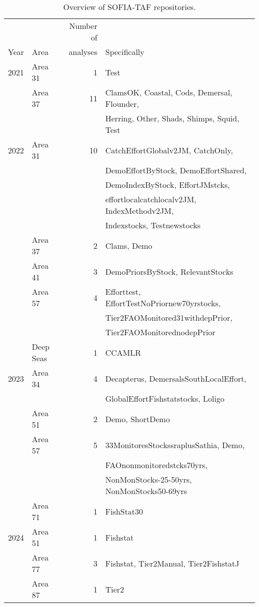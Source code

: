 \documentclass[12pt]{article}
\newcommand\I[1]{\rule{0pt}{#1}}
\begin{document}
\begin{table}[htb]\small
  \caption{Overview of SOFIA-TAF repositories.}
  \centering
  \begin{tabular}{llrl}
    \hline
    ~ & ~ & Number of\I{2.4ex}\\
    Year & Area & analyses & Specifically\\
    \hline
    2021 & Area 31   &  1 & Test\I{2.4ex}\\[0.2ex]
    ~    & Area 37   & 11 & ClamsOK, Coastal, Cods, Demersal, Flounder,\\
    ~    & ~         &  ~ & Herring, Other, Shads, Shimps, Squid, Test\\[0.5ex]
    2022 & Area 31   & 10 & CatchEffortGlobalv2JM, CatchOnly,\\
    ~    & ~         &  ~ & DemoEffortByStock, DemoEffortShared,\\
    ~    & ~         &  ~ & DemoIndexByStock, EffortJMstcks,\\
    ~    & ~         &  ~ & effortlocalcatchlocalv2JM, IndexMethodv2JM,\\
    ~    & ~         &  ~ & Indexstocks, Testnewstocks\\[0.2ex]
    ~    & Area 37   &  2 & Clams, Demo\\[0.2ex]
    ~    & Area 41   &  3 & DemoPriorsByStock, RelevantStocks\\[0.2ex]
    ~    & Area 57   &  4 & Efforttest, EffortTestNoPriornew70yrstocks,\\
    ~    & ~         &  ~ & Tier2FAOMonitored31withdepPrior,\\
    ~    & ~         &  ~ & Tier2FAOMonitorednodepPrior\\[0.2ex]
    ~    & Deep Seas &  1 & CCAMLR\\[0.5ex]
    2023 & Area 34   &  4 & Decapterus, DemersalsSouthLocalEffort,\\
    ~    & ~         &  ~ & GlobalEffortFishstatstocks, Loligo\\[0.2ex]
    ~    & Area 51   &  2 & Demo, ShortDemo\\[0.2ex]
    ~    & Area 57   &  5 & 33MonitoresStockssraplusSathia, Demo,\\
    ~    & ~         &  ~ & FAOnonmonitoredstcks70yrs,\\
    ~    & ~         &  ~ & NonMonStocks-25-50yrs, NonMonStocks50-69yrs\\[0.2ex]
    ~    & Area 71   &  1 & FishStat30\\[0.5ex]
    2024 & Area 51   &  1 & Fishstat\\[0.2ex]
    ~    & Area 77   &  3 & Fishstat, Tier2Manual, Tier2FishstatJ\\[0.2ex]
    ~    & Area 87   &  1 & Tier2\\[0.1ex]
    \hline
  \end{tabular}
  \label{tab:repository-count}
  \vspace{1.5ex}
\end{table}
\end{document}

